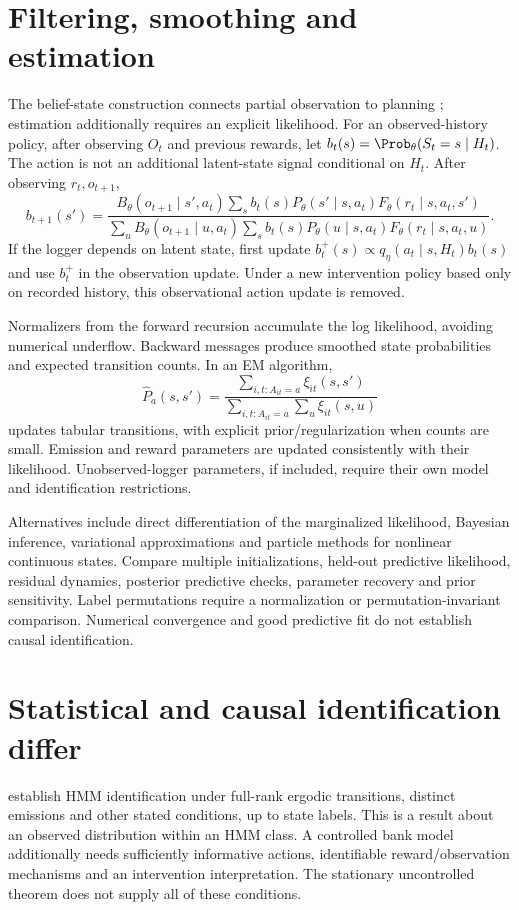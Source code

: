 \section{Filtering, smoothing and estimation}
The belief-state construction connects partial observation to planning
\citep{kaelbling1998}; estimation additionally requires an explicit likelihood.
For an observed-history policy, after observing $O_t$ and previous rewards,
let $b_t(s)=\Prob_\theta(S_t=s\mid H_t)$.
The action is not an additional latent-state signal conditional on $H_t$.
After observing $r_t,o_{t+1}$,
\begin{equation}
 b_{t+1}(s')=
 \frac{B_\theta(o_{t+1}\mid s',a_t)
 \sum_s b_t(s)P_\theta(s'\mid s,a_t)F_\theta(r_t\mid s,a_t,s')}
 {\sum_{u}B_\theta(o_{t+1}\mid u,a_t)
 \sum_s b_t(s)P_\theta(u\mid s,a_t)F_\theta(r_t\mid s,a_t,u)}.
 \label{eq:belief}
\end{equation}
If the logger depends on latent state, first update
$b_t^+(s)\propto q_\eta(a_t\mid s,H_t)b_t(s)$ and use $b_t^+$ in
the observation update. Under a new intervention policy based only on
recorded history, this observational action update is removed.

Normalizers from the forward recursion accumulate the log likelihood,
avoiding numerical underflow. Backward messages produce smoothed state
probabilities and expected transition counts. In an EM algorithm,
\[
 \widehat P_a(s,s')=
 \frac{\sum_{i,t:A_{it}=a}\xi_{it}(s,s')}
      {\sum_{i,t:A_{it}=a}\sum_u\xi_{it}(s,u)}
\]
updates tabular transitions, with explicit prior/regularization when
counts are small. Emission and reward parameters are updated consistently
with their likelihood. Unobserved-logger parameters, if included, require
their own model and identification restrictions.

Alternatives include direct differentiation of the marginalized likelihood,
Bayesian inference, variational approximations and particle methods for
nonlinear continuous states. Compare multiple initializations, held-out
predictive likelihood, residual dynamics, posterior predictive checks,
parameter recovery and prior sensitivity. Label permutations require a
normalization or permutation-invariant comparison. Numerical convergence
and good predictive fit do not establish causal identification.

\section{Statistical and causal identification differ}
\citet{hmmident2016} establish HMM identification under full-rank ergodic
transitions, distinct emissions and other stated conditions, up to state
labels. This is a result about an observed distribution within an HMM
class. A controlled bank model additionally needs sufficiently informative
actions, identifiable reward/observation mechanisms and an intervention
interpretation. The stationary uncontrolled theorem does not supply all
of these conditions.

